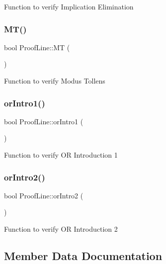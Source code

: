 Function to verify Implication Elimination \mbox{\label{classProofLine_abbc92e738aea8f3aa60a2b252ebfb9c6}} 
\subsubsection{\texorpdfstring{M\+T()}{MT()}}
{\footnotesize\ttfamily bool Proof\+Line\+::\+MT (\begin{DoxyParamCaption}{ }\end{DoxyParamCaption})\hspace{0.3cm}{\ttfamily [protected]}}

Function to verify Modus Tollens \mbox{\label{classProofLine_aec5ed54b54b88fb6e1a28dc81e95c670}} 
\subsubsection{\texorpdfstring{or\+Intro1()}{orIntro1()}}
{\footnotesize\ttfamily bool Proof\+Line\+::or\+Intro1 (\begin{DoxyParamCaption}{ }\end{DoxyParamCaption})\hspace{0.3cm}{\ttfamily [protected]}}

Function to verify OR Introduction 1 \mbox{\label{classProofLine_af445475b7ba7083bc67b3066dbfefc95}} 
\subsubsection{\texorpdfstring{or\+Intro2()}{orIntro2()}}
{\footnotesize\ttfamily bool Proof\+Line\+::or\+Intro2 (\begin{DoxyParamCaption}{ }\end{DoxyParamCaption})\hspace{0.3cm}{\ttfamily [protected]}}

Function to verify OR Introduction 2 

\subsection{Member Data Documentation}
\mbox{\label{classProofLine_a7bf8a305e7ad620013a2ebb0388e2531}} 
